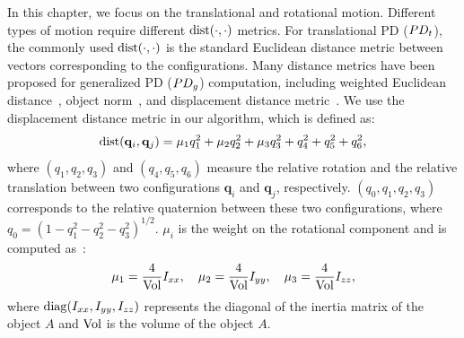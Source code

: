 In this chapter, we focus on the translational and rotational motion. Different types of motion require different $\operatorname{dist}(\cdot,\cdot)$ metrics.
For translational PD ($PD_t$), the commonly used $\operatorname{dist}(\cdot, \cdot)$ is the standard Euclidean distance metric between vectors corresponding to the configurations. Many distance metrics have been proposed for generalized PD ($PD_g$) computation, including weighted Euclidean
distance~\cite{Wang:CBO:2012}, object norm~\cite{Je:2012:PRP,Tang:IGP:2013}, and displacement distance metric~\cite{Zhang:2007:AFP}. We use the displacement distance metric in our algorithm, which is defined as:
\begin{align}
\label{eq:PDgmetric}
\operatorname{dist}(\mathbf q_i, \mathbf q_j) = \mu_1 q_1^2 + \mu_2 q_2^2 + \mu_3 q_3^2 + q_4^2 + q_5^2 + q_6^2,
\end{align}
where $(q_1, q_2, q_3)$ and $(q_4, q_5, q_6)$ measure the relative rotation and the relative translation between two configurations $\mathbf q_i$ and $\mathbf q_j$, respectively. $(q_0, q_1, q_2, q_3)$ corresponds to the relative quaternion between these two configurations, where $q_0=(1- q_1^2-q_2^2-q_3^2)^{1/2}$. $\mu_i$ is the weight on the rotational component and is computed as~\cite{Zhang:2007:AFP}:
\begin{align}
\label{eq:PDgmetricMu}
\mu_1 = \frac{4}{\vol}I_{xx}, \ \ \  \mu_2 = \frac{4}{\vol}I_{yy}, \ \ \  \mu_3 = \frac{4}{\vol}I_{zz},
\end{align}
where $\diag(I_{xx}, I_{yy}, I_{zz})$ represents the diagonal of the inertia matrix of the object $A$ and $\operatorname{Vol}$ is the volume of the object $A$. 



